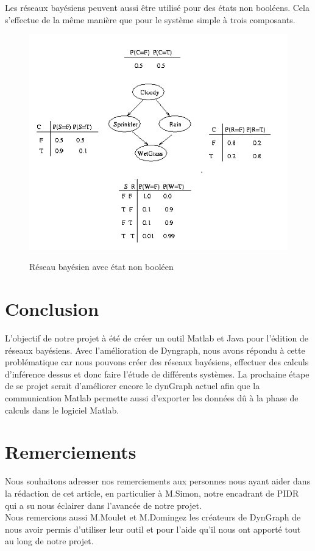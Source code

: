 \documentclass[conference]{IEEEtran}
\begin{document}
Les réseaux bayésiens peuvent aussi être utilisé pour des états non booléens. Cela s'effectue de la même manière que pour le système simple à trois composants.

\begin{figure}[!h]
\begin{center}
\includegraphics[scale=0.7]{Rain.png}
\label{fig 7}
\caption{Réseau bayésien avec état non booléen}
\end{center}
\end{figure}



\section{Conclusion}
	L'objectif de notre projet à été de créer un outil Matlab et Java pour l'édition de réseaux bayésiens. Avec l'amélioration de Dyngraph, nous avons répondu à cette problématique car nous pouvons créer des réseaux bayésiens, effectuer des calculs d'inférence dessus et donc faire l'étude de différents systèmes. La prochaine étape de se projet serait d'améliorer encore le dynGraph actuel afin que la communication Matlab permette aussi d'exporter les données dû à la phase de calculs dans le logiciel Matlab.
	

\section{Remerciements}
Nous souhaitons adresser nos remerciements aux personnes nous ayant aider dans la rédaction
de cet article, en particulier à M.Simon, notre encadrant de PIDR qui a su nous éclairer dans l'avancée de notre projet. \\
Nous remercions aussi M.Moulet et M.Domingez les créateurs de DynGraph de nous avoir permis d'utiliser leur outil et pour  l'aide qu'il nous ont apporté tout au long de notre projet. 
\end{document}
